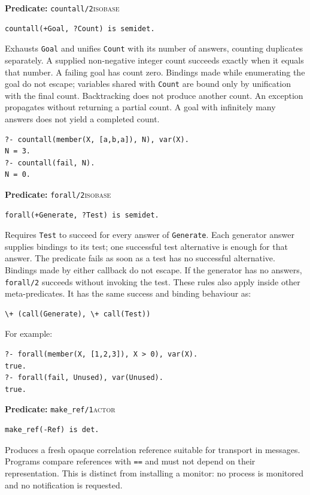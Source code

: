 \par{}
\noindent \textbf{Predicate:} \texttt{countall/2}\hfill\textsc{isobase}
\begin{verbatim}
countall(+Goal, ?Count) is semidet.
\end{verbatim}
\noindent Exhausts \texttt{Goal} and unifies \texttt{Count} with its number of
answers, counting duplicates separately. A supplied non-negative integer
count succeeds exactly when it equals that number. A failing goal has count
zero. Bindings made while enumerating the goal do not escape; variables shared
with \texttt{Count} are bound only by unification with the final count.
Backtracking does not produce another count. An exception propagates without
returning a partial count. A goal with infinitely many answers does not yield
a completed count.
\begin{verbatim}
?- countall(member(X, [a,b,a]), N), var(X).
N = 3.
?- countall(fail, N).
N = 0.
\end{verbatim}

\par{}
\noindent \textbf{Predicate:} \texttt{forall/2}\hfill\textsc{isobase}
\begin{verbatim}
forall(+Generate, ?Test) is semidet.
\end{verbatim}
\noindent Requires \texttt{Test} to succeed for every answer of
\texttt{Generate}. Each generator answer supplies bindings to its test; one
successful test alternative is enough for that answer. The predicate fails
as soon as a test has no successful alternative. Bindings made by either
callback do not escape. If the generator has no answers, \texttt{forall/2}
succeeds without invoking the test. These rules also apply inside other
meta-predicates. It has the same success and binding behaviour as:
\begin{verbatim}
\+ (call(Generate), \+ call(Test))
\end{verbatim}
\noindent For example:
\begin{verbatim}
?- forall(member(X, [1,2,3]), X > 0), var(X).
true.
?- forall(fail, Unused), var(Unused).
true.
\end{verbatim}

\noindent \textbf{Predicate:} \texttt{make\_\allowbreak{}ref/\allowbreak{}1}\hfill\textsc{actor}
\begin{verbatim}
make_ref(-Ref) is det.
\end{verbatim}
\noindent Produces a fresh opaque correlation reference suitable for
transport in messages. Programs compare references with \texttt{==} and
must not depend on their representation. This is distinct from installing
a monitor: no process is monitored and no notification is requested.\\

